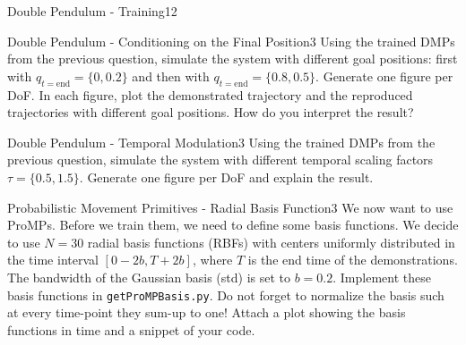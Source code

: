 \begin{questions}
\begin{question}{Double Pendulum - Training}{12}
\begin{answer}\end{answer}

\end{question}




\begin{question}{Double Pendulum - Conditioning on the Final Position}{3}
Using the trained DMPs from the previous question, simulate the system with different goal positions: first with $q_{t=\mathrm{end}} = \{0, 0.2\}$ and then with $q_{t=\mathrm{end}} = \{0.8, 0.5\}$. Generate one figure per DoF. In each figure, plot the demonstrated trajectory and the reproduced trajectories with different goal positions.
How do you interpret the result? 

\begin{answer}\end{answer}


\end{question}


\begin{question}{Double Pendulum - Temporal Modulation}{3}
Using the trained DMPs from the previous question, simulate the system with different temporal scaling factors $\tau=\{0.5, 1.5\}$. Generate one figure per DoF and explain the result.

\begin{answer}\end{answer}


\end{question}


\begin{question}[bonus]{Probabilistic Movement Primitives - Radial Basis Function}{3}
We now want to use ProMPs. Before we train them, we need to define some basis functions. We decide to use $N = 30$ radial basis functions (RBFs) with centers uniformly distributed in the time interval $[0-2b,T+2b]$, where $T$ is the end time of the demonstrations.
The bandwidth of the Gaussian basis (std) is set to $b=0.2$. 
Implement these basis functions in \texttt{getProMPBasis.py}. 
Do not forget to normalize the basis such at every time-point they sum-up to one! Attach a plot showing the basis functions in time and a snippet of your code. 


\end{question}
\end{questions}
